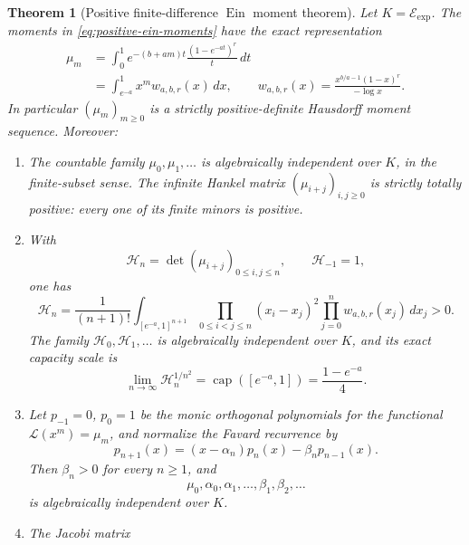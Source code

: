 \documentclass[11pt]{article}
\newtheorem{theorem}{Theorem}[section]
\theoremstyle{definition}
\theoremstyle{remark}
\newcommand{\Ein}{\operatorname{Ein}}
\newcommand{\Eexp}{\mathcal E_{\mathrm{exp}}}
\begin{document}
\begin{theorem}[Positive finite-difference $\Ein$ moment theorem]
\label{thm:positive-ein-jacobi}
Let $K=\Eexp$.  The moments in
\eqref{eq:positive-ein-moments} have the exact representation
\begin{align}
 \mu_m
 &=\int_0^1 e^{-(b+am)t}\frac{(1-e^{-at})^r}{t}\,dt
 \label{eq:positive-ein-laplace}\\
 &=\int_{e^{-a}}^1 x^m w_{a,b,r}(x)\,dx,
 \qquad
 w_{a,b,r}(x)=
 \frac{x^{b/a-1}(1-x)^r}{-\log x}.
 \label{eq:positive-ein-weight}
\end{align}
In particular $(\mu_m)_{m\geq0}$ is a strictly positive-definite
Hausdorff moment sequence.  Moreover:
\begin{enumerate}
\item The countable family $\mu_0,\mu_1,\ldots$ is algebraically
independent over $K$, in the finite-subset sense.  The infinite Hankel
matrix $(\mu_{i+j})_{i,j\geq0}$ is strictly totally positive: every one
of its finite minors is positive.
\item With
\begin{equation}\label{eq:positive-ein-Hankel}
 \mathcal H_n=\det(\mu_{i+j})_{0\leq i,j\leq n},
 \qquad \mathcal H_{-1}=1,
\end{equation}
one has
\begin{equation}\label{eq:positive-ein-Heine}
 \mathcal H_n=
 \frac1{(n+1)!}
 \int_{[e^{-a},1]^{n+1}}
 \prod_{0\leq i<j\leq n}(x_i-x_j)^2
 \prod_{j=0}^n w_{a,b,r}(x_j)\,dx_j>0.
\end{equation}
The family $\mathcal H_0,\mathcal H_1,\ldots$ is algebraically
independent over $K$, and its exact capacity scale is
\begin{equation}\label{eq:positive-ein-Hankel-capacity}
 \lim_{n\to\infty}\mathcal H_n^{1/n^2}
 =\operatorname{cap}([e^{-a},1])=\frac{1-e^{-a}}4.
\end{equation}
\item Let $p_{-1}=0$, $p_0=1$ be the monic orthogonal polynomials for
the functional $\mathcal L(x^m)=\mu_m$, and normalize the Favard
recurrence by
\begin{equation}\label{eq:positive-ein-Favard}
 p_{n+1}(x)=(x-\alpha_n)p_n(x)-\beta_np_{n-1}(x).
\end{equation}
Then $\beta_n>0$ for every $n\geq1$, and
\[
 \mu_0,\alpha_0,\alpha_1,\ldots,
 \beta_1,\beta_2,\ldots
\]
is algebraically independent over $K$.
\item The Jacobi matrix
\begin{equation}\label{eq:positive-ein-Jacobi}

\end{equation}
\end{enumerate}
\end{theorem}
\end{document}
